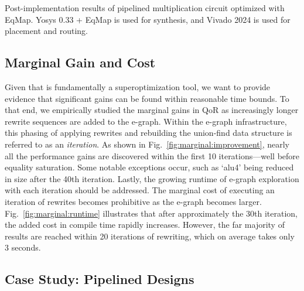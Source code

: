 \begin{table}[t]
    \centering
    \caption{Post-implementation results of pipelined multiplication circuit optimized with EqMap. Yosys 0.33 + EqMap is used for synthesis, and Vivado 2024 is used for placement and routing.}\label{tab:multiply}
\end{table}

\subsection{Marginal Gain and Cost}\label{sec:results:margin}

Given that \shortname{} is fundamentally a superoptimization tool, we want to
provide evidence that significant gains can be found within reasonable time
bounds. To that end, we empirically studied the marginal gains in QoR as
increasingly longer rewrite sequences are added to the e-graph. Within the
e-graph infrastructure, this phasing of applying rewrites and rebuilding the
union-find data structure is referred to as an \textit{iteration}. As shown in
Fig.~\ref{fig:marginal:improvement}, nearly all the performance gains are
discovered within the first 10 iterations---well before equality saturation.
Some notable exceptions occur, such as `alu4' being reduced in size after the
40th iteration. Lastly, the growing runtime of e-graph exploration with each
iteration should be addressed. The marginal cost of executing an iteration of
rewrites becomes prohibitive as the e-graph becomes larger.
Fig.~\ref{fig:marginal:runtime} illustrates that after approximately the 30th
iteration, the added cost in compile time rapidly increases. However, the far
majority of results are reached within 20 iterations of rewriting, which on
average takes only 3 seconds.

\subsection{Case Study: Pipelined Designs}\label{sec:results:retiming}

